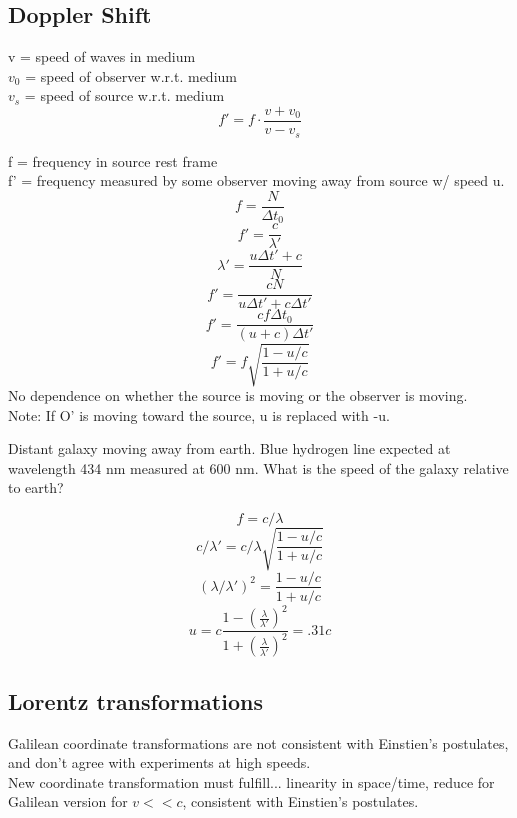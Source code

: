 \documentclass[class=article,crop=false]{standalone}
\begin{document}
\lecture
\newpage
\subsection{Doppler Shift}
\begin{result}
	v = speed of waves in medium \\
	$v_0$ = speed of observer w.r.t. medium \\
	$v_s$ = speed of source w.r.t. medium \\
	$$ f' = f \cdot \frac{v + v_0}{v-v_s}$$
\end{result}

\begin{result}
	f = frequency in source rest frame \\
	f' = frequency measured by some observer moving away from source w/ speed u.
	$$ f = \frac{N}{\Delta t_0} $$
	$$ f' = \frac{c}{\lambda '} $$
	$$ \lambda ' = \frac{u \Delta t' + c}{N} $$
	$$ f' = \frac{cN}{u \Delta t' + c \Delta t'} $$
	$$ f' = \frac{cf \Delta t_0}{(u + c) \Delta t'} $$
	$$ f' = f \sqrt{\frac{1 - u/c}{1 + u/c}} $$ 
	No dependence on whether the source is moving or the observer is moving.\\
	Note: If O' is moving toward the source, u is replaced with -u.
\end{result}

\begin{question}
	Distant galaxy moving away from earth. Blue hydrogen line expected at wavelength 434 nm measured at 600 nm. What is the speed of the galaxy relative to earth?
\end{question}
\begin{answer}
	$$ f = c/\lambda $$
	$$ c/\lambda ' = c/\lambda \sqrt{\frac{1 - u/c}{1 + u/c}} $$
	$$ (\lambda / \lambda ')^2 = \frac{1-u/c}{1+u/c} $$
	$$ u = c \frac{1 - (\frac{\lambda}{\lambda '})^2}{1 + (\frac{\lambda}{\lambda '})^2} = .31 c $$
\end{answer}

\subsection{Lorentz transformations}
Galilean coordinate transformations are not consistent with Einstien's postulates, and don't agree with experiments at high speeds. \\
New coordinate transformation must fulfill... linearity in space/time, reduce for Galilean version for $v << c$, consistent with Einstien's postulates. \\
\end{document}
